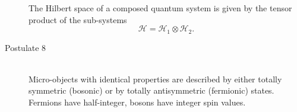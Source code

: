 \begin{description}
				The Hilbert space of a composed quantum system is given by the tensor product of the sub-systems
				\begin{equation}
					\mathcal{H} = \mathcal{H}_1 \otimes \mathcal{H}_2.
				\end{equation}
			\item[Postulate 8]\hfill \\
				Micro-objects with identical properties are described by either totally symmetric (bosonic) or by totally antisymmetric (fermionic) states. Fermions have half-integer, bosons have integer spin values.
	\end{description}
